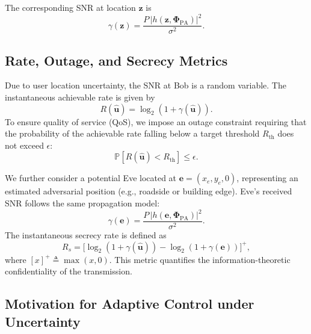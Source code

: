 \documentclass[journal,10pt]{IEEEtran}
\begin{document}
The corresponding SNR at location $\mathbf{z}$ is
\begin{equation}
\gamma(\mathbf{z}) = \frac{P\, |h(\mathbf{z}, \boldsymbol{\Phi}_{\mathrm{PA}})|^2}{\sigma^2}.
\label{eq:snr}
\end{equation}


\subsection{Rate, Outage, and Secrecy Metrics}

Due to user location uncertainty, the SNR at Bob is a random variable. The instantaneous achievable rate is given by
\begin{equation}
R(\hat{\mathbf{u}}) = \log_2\!\left(1 + \gamma(\hat{\mathbf{u}})\right).
\label{eq:achievable_rate}
\end{equation}
To ensure quality of service (QoS), we impose an outage constraint requiring that the probability of the achievable rate falling below a target threshold $R_{\mathrm{th}}$ does not exceed $\epsilon$:
\begin{equation}
\mathbb{P}\!\left[R(\hat{\mathbf{u}}) < R_{\mathrm{th}}\right] \leq \epsilon.
\label{eq:outage_constraint}
\end{equation}

We further consider a potential Eve located at $\mathbf{e} = (x_e, y_e, 0)$, representing an estimated adversarial position (e.g., roadside or building edge). Eve’s received SNR follows the same propagation model:
\begin{equation}
\gamma(\mathbf{e}) = \frac{P\, |h(\mathbf{e}, \boldsymbol{\Phi}_{\mathrm{PA}})|^2}{\sigma^2}.
\label{eq:eve_snr}
\end{equation}
The instantaneous secrecy rate is defined as
\begin{equation}
R_s =
\Big[
\log_2\!\left(1 + \gamma(\hat{\mathbf{u}})\right)
-
\log_2\!\left(1 + \gamma(\mathbf{e})\right)
\Big]^+,
\label{eq:secrecy_rate}
\end{equation}
where $[x]^+ \triangleq \max(x,0)$. This metric quantifies the information-theoretic confidentiality of the transmission.

\subsection{Motivation for Adaptive Control under Uncertainty}
\end{document}
